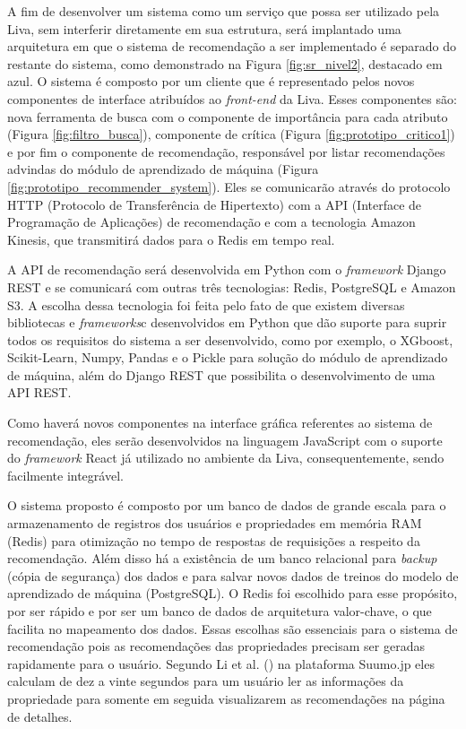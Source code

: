 A fim de desenvolver um sistema como um serviço que possa ser utilizado pela Liva, sem interferir diretamente em sua estrutura, será implantado uma arquitetura em que o sistema de recomendação a ser implementado é separado do restante do sistema, como demonstrado na Figura \ref{fig:sr_nivel2}, destacado em azul. O sistema é composto por um cliente que é representado pelos novos componentes de interface atribuídos ao \textit{front-end} da Liva. Esses componentes são: nova ferramenta de busca com o componente de importância para cada atributo (Figura \ref{fig:filtro_busca}), componente de crítica (Figura \ref{fig:prototipo_critico1}) e por fim o componente de recomendação, responsável por listar recomendações advindas do módulo de aprendizado de máquina (Figura \ref{fig:prototipo_recommender_system}). Eles se comunicarão através do protocolo HTTP (Protocolo de Transferência de Hipertexto) com a API (Interface de Programação de Aplicações) de recomendação e com a tecnologia Amazon Kinesis, que transmitirá dados para o Redis em tempo real.

A API de recomendação será desenvolvida em Python com o \textit{framework} Django REST e se comunicará com outras três tecnologias: Redis, PostgreSQL e Amazon S3. A escolha dessa tecnologia foi feita pelo fato de que existem diversas bibliotecas e \textit{frameworks}c desenvolvidos em Python que dão suporte para suprir todos os requisitos do sistema a ser desenvolvido, como por exemplo, o XGboost, Scikit-Learn, Numpy, Pandas e o Pickle para solução do módulo de aprendizado de máquina, além do Django REST que possibilita o desenvolvimento de uma API REST.

Como haverá novos componentes na interface gráfica referentes ao sistema de recomendação, eles serão desenvolvidos na linguagem JavaScript com o suporte do \textit{framework} React já utilizado no ambiente da Liva, consequentemente, sendo facilmente integrável.

O sistema proposto é composto por um banco de dados de grande escala para o armazenamento de registros dos usuários e propriedades em memória RAM (Redis) para otimização no tempo de respostas de requisições a respeito da recomendação. Além disso há a existência de um banco relacional para \textit{backup} (cópia de segurança) dos dados e para salvar novos dados de treinos do modelo de aprendizado de máquina (PostgreSQL). O Redis foi escolhido para esse propósito, por ser rápido e por ser um banco de dados de arquitetura valor-chave, o que facilita no mapeamento dos dados. Essas escolhas são essenciais para o sistema de recomendação pois as recomendações das propriedades precisam ser geradas rapidamente para o usuário. Segundo Li et al. (\citeyear{Summo:2017}) na plataforma Suumo.jp eles calculam de dez a vinte segundos para um usuário ler as informações da propriedade para somente em seguida visualizarem as recomendações na página de detalhes. 

